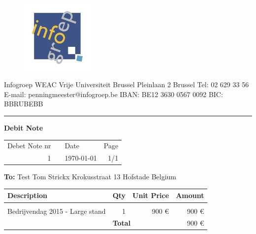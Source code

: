\documentclass{letter}
\begin{document}
\begin{figure}
  \begin{center}
    \includegraphics[width=0.32\textwidth]{invoices/ig.jpg}
  \end{center}
\end{figure}

Infogroep
\newline
WEAC
\newline
Vrije Universiteit Brussel
\newline
Pleinlaan 2 
 Brussel
\newline
\newline
Tel: 02 629 33 56
\newline
E-mail: penningmeester@infogroep.be
\newline
\newline
IBAN: BE12 3630 0567 0092
\newline
BIC: BBRUBEBB

\rule{\textwidth}{1pt}
\newline


\textbf{\huge{
Debit Note
}}

\begin{tabular}{ r p{10cm} l r}
	Debet Note nr & & Date & Page \\
	1 & & \today & 1/1 \\
\end{tabular} 
\vspace{1cm}


\textbf{To:}
\newline
Test
\newline
Tom Strickx
\newline
Krokusstraat 13
 Hofstade
\newline
Belgium




\begin{tabular}{ |p{12cm} | r | r | r |}
	\hline
	\rowcolor{lightgray}
	Description & Qty & Unit Price & Amount \\ [2pt]
	\hline
	&&&\\
	Bedrijvendag 2015 - Large stand & 1 & 900 \euro & 900  \euro \\[8cm]
	
	\hline
	
	 \multicolumn{1}{c}{}& \multicolumn{2}{|l|}{\cellcolor{lightgray} \textbf{Total}} & 900 \euro\\[2pt]
	\cline{2-4}
	
\end{tabular} 
\end{document}
